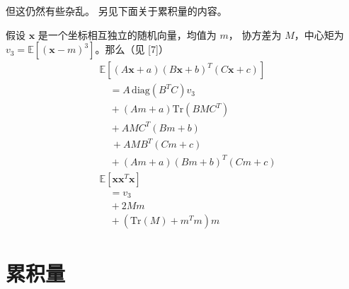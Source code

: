 但这仍然有些杂乱。
另见下面关于累积量的内容。



假设 \(\mathbf{x}\) 是一个坐标相互独立的随机向量，均值为 \(m\)，
协方差为 \(M\)，中心矩为 \(v_3 = \mathbb{E}[(\mathbf{x} - m)^3]\)。那么（见 [7]）
\begin{align*}
&\mathbb{E}[(A\mathbf{x} + a)(B\mathbf{x} + b)^T (C\mathbf{x} + c)]
\\&\quad=
A\,\mathrm{diag}(B^T C) v_3
\\&\quad+
(Am + a) \mathrm{Tr}(BMC^T)
\\&\quad+
AMC^T (Bm + b)
\\&\quad\,+
AMB^T (Cm + c)
\\&\quad+
(Am + a)(Bm + b)^T (Cm + c)
\\
  &\mathbb{E}[\mathbf{x} \mathbf{x}^T \mathbf{x}]
\\&\quad=
   v_3
\\&\quad+
   2 Mm
\\&\quad+
   (\text{Tr}(M) + m^T m) m
\end{align*}


\section{累积量}


